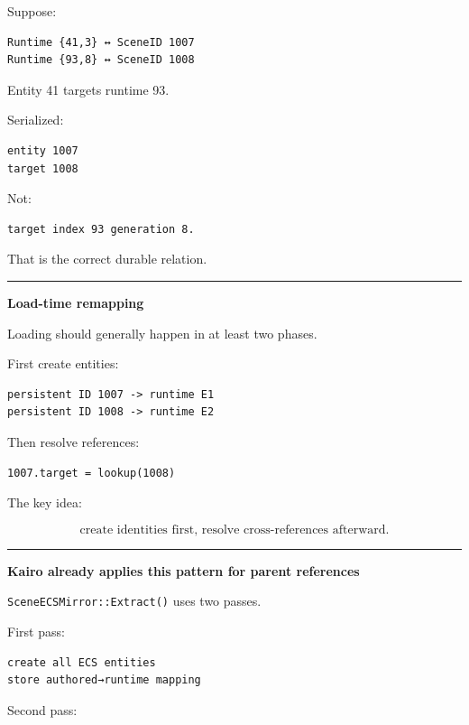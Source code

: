 Suppose:

\begin{verbatim}
Runtime {41,3} ↔ SceneID 1007
Runtime {93,8} ↔ SceneID 1008
\end{verbatim}

Entity 41 targets runtime 93.

Serialized:

\begin{verbatim}
entity 1007
target 1008
\end{verbatim}

Not:

\begin{verbatim}
target index 93 generation 8.
\end{verbatim}

That is the correct durable relation.

\begin{center}\rule{0.5\linewidth}{0.5pt}\end{center}

\textbf{Load-time remapping}

Loading should generally happen in at least two phases.

First create entities:

\begin{verbatim}
persistent ID 1007 -> runtime E1
persistent ID 1008 -> runtime E2
\end{verbatim}

Then resolve references:

\begin{verbatim}
1007.target = lookup(1008)
\end{verbatim}

The key idea:

\[
\boxed{
\text{create identities first,
resolve cross-references afterward}.
}
\]

\begin{center}\rule{0.5\linewidth}{0.5pt}\end{center}

\textbf{Kairo already applies this pattern for parent references}

\texttt{SceneECSMirror::Extract()} uses two passes.

First pass:

\begin{verbatim}
create all ECS entities
store authored→runtime mapping
\end{verbatim}

Second pass:

